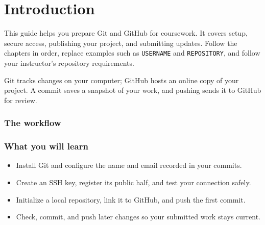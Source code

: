 \chapter{Introduction}
\label{ch:introduction}

This guide helps you prepare Git and GitHub for coursework. It covers setup, secure access, publishing your project, and submitting updates. Follow the chapters in order, replace examples such as \texttt{USERNAME} and \texttt{REPOSITORY}, and follow your instructor's repository requirements.

Git tracks changes on your computer; GitHub hosts an online copy of your project. A commit saves a snapshot of your work, and pushing sends it to GitHub for review.

\subsection*{The workflow}
\begin{center}
\end{center}

\subsection*{What you will learn}
\begin{itemize}[leftmargin=1.5em,itemsep=0.3em,topsep=0.2em,label=\textcolor{UTPTeal}{\faCheck}]
  \item Install Git and configure the name and email recorded in your commits.
  \item Create an SSH key, register its public half, and test your connection safely.
  \item Initialize a local repository, link it to GitHub, and push the first commit.
  \item Check, commit, and push later changes so your submitted work stays current.
\end{itemize}

